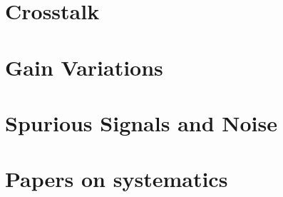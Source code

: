 \documentclass[
12pt, %
letterpaper, %
oneside, %
headinclude,footinclude, %
BCOR5mm, %
]{scrartcl}
\begin{document}
\section{Crosstalk}




\section{Gain Variations}




\section{Spurious Signals and Noise}






\section{Papers on systematics}




 


\renewcommand{\refname}{\spacedlowsmallcaps{References}} %


\end{document}
